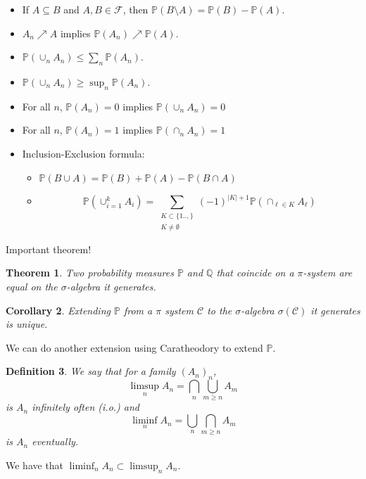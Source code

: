 \documentclass{article}
\newtheorem{theorem}{Theorem}
\newtheorem{corollary}[theorem]{Corollary}
\newtheorem{definition}[theorem]{Definition}
\theoremstyle{definition}
\numberwithin{theorem}{section}
\numberwithin{equation}{section}
\begin{document}
\begin{itemize}
	\item If $A \subseteq B$ and $A, B \in \mathcal{F}$, then $\mathbb{P}(B \setminus A) = \mathbb{P}(B) - \mathbb{P}(A)$.
	\item $A_n \nearrow A$ implies $\mathbb{P}(A_n) \nearrow \mathbb{P}(A)$.
	\item $\mathbb{P}\left(\cup_n A_n\right) \leq \sum_n \mathbb{P}(A_n)$. 
	\item $\mathbb{P}\left(\cup_n A_n\right) \geq \sup_n \mathbb{P}(A_n)$. 
	\item For all $n$, $\mathbb{P}(A_n) = 0$ implies $\mathbb{P}(\cup_n A_n) = 0$
	\item For all $n$, $\mathbb{P}(A_n) = 1$ implies $\mathbb{P}(\cap_n A_n) = 1$
	\item Inclusion-Exclusion formula:
	
	\begin{itemize}
		\item 	$\mathbb{P}(B \cup A) = \mathbb{P}(B) + \mathbb{P}(A) - \mathbb{P}(B \cap A)$
		\item\begin{equation}
			 \mathbb{P}\left(\cup_{i = 1}^k A_i\right) = \sum_{\substack{K \subset \lbrace 1 .. , \rbrace \\ K \neq \emptyset } } (-1)^{|K| + 1} \mathbb{P}\left(\cap_{\ell \in K} A_\ell\right)
		\end{equation}
		
	\end{itemize}
\end{itemize}

Important theorem!
\begin{theorem}
	Two probability measures $\mathbb{P}$ and $\mathbb{Q}$ that coincide on a $\pi$-system are equal on the $\sigma$-algebra it generates.
\end{theorem}

\begin{corollary}
	Extending $\mathbb{P}$ from a $\pi$ system $\mathcal{C}$ to the $\sigma$-algebra $\sigma(\mathcal{C})$ it generates is unique.
\end{corollary}

We can do another extension using Caratheodory to extend $\mathbb{P}$.

\begin{definition}
	We say that for a family $(A_n)_n$, 
	\begin{equation}
		\limsup_n A_n = \bigcap_n \bigcup_{m \geq n} A_m
	\end{equation}
	is $A_n$ infinitely often (i.o.)
	and 
	\begin{equation}
		\liminf_n A_n = \bigcup_n \bigcap_{m \geq n} A_m 
	\end{equation}
	is $A_n$ eventually. 
\end{definition}
We have that $\liminf_n A_n \subset \limsup_n A_n$. 
\end{document}
